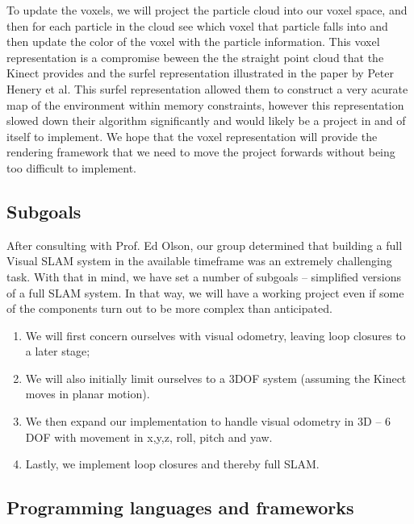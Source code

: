 \documentclass[12pt]{article}
\begin{document}
To update the voxels, we will project the particle cloud into our voxel space, and then for each particle in the cloud see which voxel that particle falls into and then update the color of the voxel with the particle information.
This voxel representation is a compromise beween the the straight point cloud that the Kinect provides and the surfel representation illustrated in the paper by Peter Henery et al. This surfel representation allowed them to construct a very acurate map of the environment within memory constraints, however this representation slowed down their algorithm significantly and would likely be a project in and of itself to implement.  We hope that the voxel representation will provide the rendering framework that we need to move the project forwards without being too difficult to implement.

\subsection{Subgoals}

After consulting with Prof. Ed Olson, our group determined that building a full Visual SLAM system in the available timeframe was an extremely challenging task.
With that in mind, we have set a number of subgoals -- simplified versions of a full SLAM system. In that way, we will have a working project even if
some of the components turn out to be more complex than anticipated.

\begin{enumerate}
\item We will first concern ourselves with visual odometry, leaving loop closures to a later stage;
\item We will also initially limit ourselves to a 3DOF system (assuming the Kinect moves in planar motion).
\item We then expand our implementation to handle visual odometry in 3D -- 6 DOF with movement in x,y,z, roll, pitch and yaw.
\item Lastly, we implement loop closures and thereby full SLAM. 
\end{enumerate}

\subsection{Programming languages and frameworks}
\end{document}
